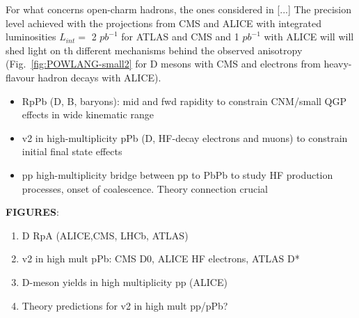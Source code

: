For what concerns open-charm hadrons, the ones considered in [...]
The precision level achieved with the projections from CMS and ALICE with integrated luminosities $L_{int}=$ 2 $pb^{-1}$ for ATLAS and CMS and 1 $pb^{-1}$ with ALICE will will shed light on th different mechanisms behind the observed anisotropy (Fig.~\ref{fig:POWLANG-small2} for D mesons with CMS and electrons from heavy-flavour hadron decays with ALICE).


\begin{itemize}
\item{RpPb} (D, B, baryons): mid and fwd rapidity to constrain CNM/small QGP effects in wide kinematic range
\item{v2}  in high-multiplicity pPb (D, HF-decay electrons and muons) to constrain initial final state effects
\item{pp high-multiplicity} bridge between pp to PbPb to study HF production processes, onset of coalescence.
Theory connection crucial
\end{itemize}

\textbf{FIGURES}:
\begin{enumerate}
\item D RpA (ALICE,CMS, LHCb, ATLAS)
\item v2 in high mult pPb: CMS D0,  ALICE HF electrons, ATLAS D*
\item D-meson yields in high multiplicity pp (ALICE)
\item Theory predictions for v2 in high mult pp/pPb?
\end{enumerate}

